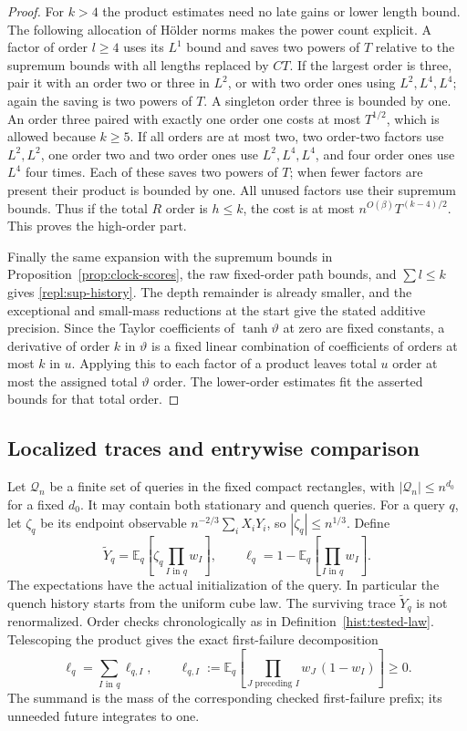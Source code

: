 \begin{proof}
For $k>4$ the product estimates need no late gains or lower length bound.
The following allocation of H\"older norms makes the power count explicit.
A factor of order $l\ge4$ uses its $L^1$ bound and saves two powers of
$T$ relative to the supremum bounds with all lengths replaced by $CT$.
If the largest order
is three, pair it with an order two or three in $L^2$, or with two order
ones using $L^2,L^4,L^4$; again the saving is two powers of $T$.
A singleton order three is bounded by one.  An order three paired with
exactly one order one costs at most $T^{1/2}$, which is allowed because
$k\ge5$.  If all orders are at most two, two order-two factors use
$L^2,L^2$, one order two and two order ones use $L^2,L^4,L^4$, and four
order ones use $L^4$ four times.  Each of these saves two powers of $T$;
when fewer factors are present their product is bounded by one.
All unused factors use their supremum bounds.  Thus if the total $R$
order is $h\le k$, the cost is at most
$n^{O(\beta)}T^{(k-4)/2}$.  This proves the high-order part.

Finally the same expansion with the supremum bounds in
Proposition~\ref{prop:clock-scores}, the raw fixed-order path bounds, and
$\sum l\le k$ gives \eqref{repl:sup-history}.  The depth remainder is
already smaller, and the exceptional and small-mass reductions at the
start give the stated additive precision.  Since the Taylor coefficients
of $\tanh\vartheta$ at zero are fixed constants, a derivative of order $k$
in $\vartheta$ is a fixed linear combination of coefficients of orders at
most $k$ in $u$.  Applying this to each factor of a product leaves total
$u$ order at most the assigned total $\vartheta$ order.  The lower-order
estimates fit the asserted bounds for that total order.
\end{proof}

\subsection{Localized traces and entrywise comparison}

Let $\mathcal Q_n$ be a finite set of queries in the fixed compact
rectangles, with $|\mathcal Q_n|\le n^{d_0}$ for a fixed $d_0$.  It may
contain both stationary and quench queries.  For a query $q$, let
$\zeta_q$ be its endpoint observable
$n^{-2/3}\sum_i X_iY_i$, so $|\zeta_q|\le n^{1/3}$.  Define
\[
 \widetilde Y_q=
 \mathbb E_q\left[\zeta_q\prod_{I\text{ in }q}w_I\right],
 \qquad
 \ell_q=1-\mathbb E_q\left[\prod_{I\text{ in }q}w_I\right].
\]
The expectations have the actual initialization of the query.  In
particular the quench history starts from the uniform cube law.
The surviving trace $\widetilde Y_q$ is not renormalized.
Order checks chronologically as in Definition~\ref{hist:tested-law}.  Telescoping
the product gives the exact first-failure decomposition
\begin{equation}\label{repl:first-failure}
 \ell_q=\sum_{I\text{ in }q}\ell_{q,I},\qquad
 \ell_{q,I}:=\mathbb E_q\left[
       \prod_{J\text{ preceding }I}w_J\,(1-w_I)\right]\ge0 .
\end{equation}
The summand is the mass of the corresponding checked first-failure prefix;
its unneeded future integrates to one.

